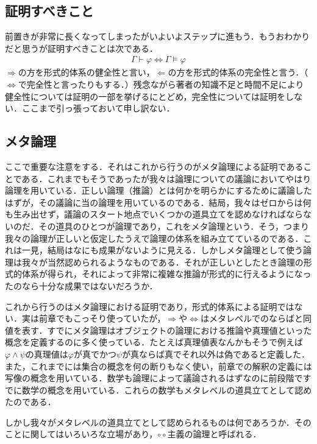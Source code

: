 \documentclass[10pt,b5paper,papersize,dvipdfmx]{jsbook}
\begin{document}
\subsection{証明すべきこと}
前置きが非常に長くなってしまったがいよいよステップに進もう．もうおわかりだと思うが証明すべきことは次である．
\begin{align}
\Gamma \vdash \varphi \Leftrightarrow \Gamma \models \varphi
\end{align}
$\Rightarrow$の方を形式的体系の健全性と言い，$\Leftarrow$の方を形式的体系の完全性と言う．（$\Leftrightarrow$で完全性と言ったりもする．）残念ながら著者の知識不足と時間不足により健全性については証明の一部を挙げるにとどめ，完全性については証明をしない．ここまで引っ張っておいて申し訳ない．
\subsection{メタ論理}
ここで重要な注意をする．それはこれから行うのがメタ論理による証明であることである．これまでもそうであったが我々は論理についての議論においてやはり論理を用いている．正しい論理（推論）とは何かを明らかにするために議論したはずが，その議論に当の論理を用いているのである．結局，我々はゼロからは何も生み出せず，議論のスタート地点でいくつかの道具立てを認めなければならないのだ．その道具のひとつが論理であり，これをメタ論理という．そう，つまり我々の論理が正しいと仮定したうえで論理の体系を組み立てているのである．これは一見，結局はなにも成果がないように見える．しかしメタ論理として使う論理は我々が当然認められるようなものである．それが正しいとしたとき論理の形式的体系が得られ，それによって非常に複雑な推論が形式的に行えるようになったのなら十分な成果ではないだろうか．\par
これから行うのはメタ論理における証明であり，形式的体系による証明ではない．実は前章でもこっそり使っていたが，$\Rightarrow$や$\Leftrightarrow$はメタレベルでのならばと同値を表す．すでにメタ論理はオブジェクトの論理における推論や真理値といった概念を定義するのに多く使っている．たとえば真理値表なんかもそうで例えば$\varphi \land \psi$の真理値は$\varphi$が真でかつ$\psi$が真ならば真でそれ以外は偽であると定義した．また，これまでには集合の概念を何の断りもなく使い，前章での解釈の定義には写像の概念を用いている．数学も論理によって議論されるはずなのに前段階ですでに数学の概念を用いている．これらの数学もメタレベルの道具立てとして認めたのである．\par
しかし我々がメタレベルの道具立てとして認められるものは何であろうか．そのことに関してはいろいろな立場があり，$\circ \circ$主義の論理と呼ばれる．\par
\end{document}
